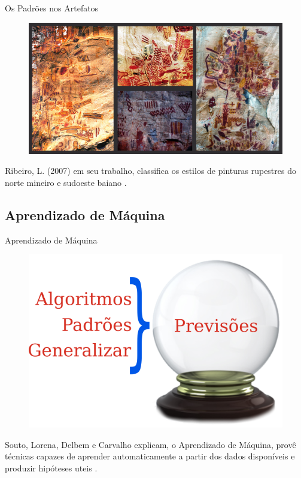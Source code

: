    \begin{frame}[fragile]{Os Padrões nos Artefatos}
        \begin{figure}[H]
        \begin{center}
            \includegraphics[scale=0.60]{images/arte_rupestre.png}
        \end{center}
        \end{figure}

        Ribeiro, L. (2007) em seu trabalho, classifica os estilos de pinturas
        rupestres do norte mineiro e sudoeste baiano 
        \cite{ribeiro2007repensando}.
    \end{frame}

\subsection{Aprendizado de Máquina}
    \begin{frame}[fragile]{Aprendizado de Máquina}
        \begin{figure}[H]
        \begin{center}
            \includegraphics[scale=0.50]{images/previsao.png}
        \end{center}
        \end{figure}

        Souto, Lorena, Delbem e Carvalho explicam, o Aprendizado de Máquina, 
        provê técnicas capazes de aprender automaticamente a partir dos dados 
        disponíveis e produzir hipóteses uteis \cite{de2003tecnicas}.

  \end{frame}
  
